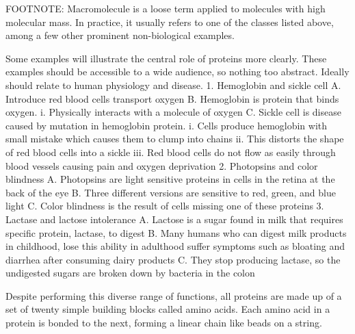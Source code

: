 FOOTNOTE: Macromolecule is a loose term applied to molecules with high molecular mass. In practice, it usually refers to one of the classes listed above, among a few other prominent non-biological examples.

Some examples will illustrate the central role of proteins more clearly.
These examples should be accessible to a wide audience, so nothing too abstract. Ideally should relate to human physiology and disease.
    1. Hemoglobin and sickle cell
        A. Introduce red blood cells transport oxygen
        B. Hemoglobin is protein that binds oxygen.
            i. Physically interacts with a molecule of oxygen
        C. Sickle cell is disease caused by mutation in hemoglobin protein.
            i. Cells produce hemoglobin with small mistake which causes them to clump into chains
            ii. This distorts the shape of red blood cells into a sickle
            iii. Red blood cells do not flow as easily through blood vessels causing pain and oxygen deprivation
    2. Photopsins and color blindness
        A. Photopsins are light sensitive proteins in cells in the retina at the back of the eye
        B. Three different versions are sensitive to red, green, and blue light
        C. Color blindness is the result of cells missing one of these proteins
    3. Lactase and lactose intolerance
        A. Lactose is a sugar found in milk that requires specific protein, lactase, to digest
        B. Many humans who can digest milk products in childhood, lose this ability in adulthood suffer symptoms such as bloating and diarrhea after consuming dairy products
        C. They stop producing lactase, so the undigested sugars are broken down by bacteria in the colon

Despite performing this diverse range of functions, all proteins are made up of a set of twenty simple building blocks called amino acids. Each amino acid in a protein is bonded to the next, forming a linear chain like beads on a string.